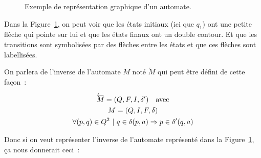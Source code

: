 \begin{figure}[H]
    \centering
    \captionsetup{type=figure,justification=centering}
    \caption{
        Exemple de représentation graphique d'un automate.
    }\label{fig:automata}
\end{figure}

Dans la Figure~\ref{fig:automata}, on peut voir que les états initiaux (ici que
\(q_1\)) ont une petite flèche qui pointe sur lui et que les états finaux ont
un double contour. Et que les transitions sont symbolisées par des flèches
entre les états et que ces flèches sont labellisées.

\vphantom{}

On parlera de l'inverse de l'automate \(M\) noté \(\overleftarrow{M}\) qui peut
être défini de cette façon~:

\begin{gather*}
    \overleftarrow{M} = (Q, F, I, \delta') \quad \text{avec} \\
    M = (Q, I, F, \delta) \notag \\
    \forall (p, q) \in Q^2 ~|~ q \in \delta(p, a) \Rightarrow p \in \delta'(q, a) \notag
\end{gather*}

Donc si on veut représenter l'inverse de l'automate représenté dans la
Figure~\ref{fig:automata}, ça nous donnerait ceci~:

